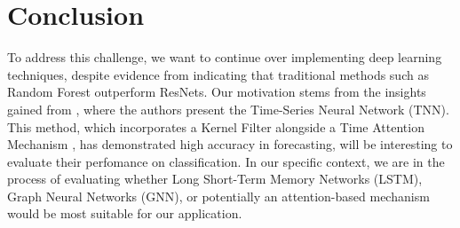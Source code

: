 \documentclass{article}
\begin{document}
\section{Conclusion}

To address this challenge, we want to continue over implementing deep learning techniques, despite evidence from \cite{Sundararajan2021} indicating that traditional methods such as Random Forest outperform ResNets. Our motivation stems from the insights gained from \cite{Zhang2023}, where the authors present the Time-Series Neural Network (TNN). This method, which incorporates a Kernel Filter alongside a Time Attention Mechanism \cite{Zhang2023}, has demonstrated high accuracy in forecasting, will be interesting to evaluate their perfomance on classification. In our specific context, we are in the process of evaluating whether Long Short-Term Memory Networks (LSTM), Graph Neural Networks (GNN), or potentially an attention-based mechanism would be most suitable for our application.


{
\small
}
\end{document}
